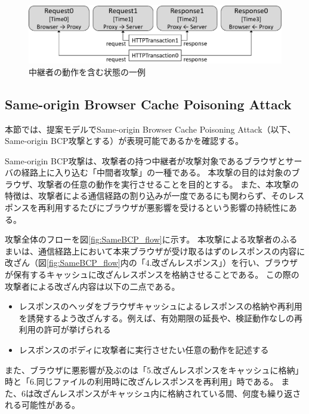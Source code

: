 \documentclass[journal]{IEEEtran}
\begin{document}
\begin{figure}[htb]
\centering
\includegraphics[width=\hsize]{./fig/TestIntermediary.eps}
\caption{中継者の動作を含む状態の一例}
\label{fig:TestIntermediary}
\end{figure}

\subsection{Same-origin Browser Cache Poisoning Attack}
\label{sec:same-origin-bcp}
本節では、提案モデルでSame-origin Browser Cache Poisoning Attack\cite{bcpattack}（以下、Same-origin BCP攻撃とする）が表現可能であるかを確認する。

Same-origin BCP攻撃は、攻撃者の持つ中継者が攻撃対象であるブラウザとサーバの経路上に入り込む「中間者攻撃」の一種である。
本攻撃の目的は対象のブラウザ、攻撃者の任意の動作を実行させることを目的とする。
また、本攻撃の特徴は、攻撃者による通信経路の割り込みが一度であるにも関わらず、そのレスポンスを再利用するたびにブラウザが悪影響を受けるという影響の持続性にある。

攻撃全体のフローを図\ref{fig:SameBCP_flow}に示す。
本攻撃による攻撃者のふるまいは、通信経路上において本来ブラウザが受け取るはずのレスポンスの内容に改ざん（図\ref{fig:SameBCP_flow}内の「4.改ざんレスポンス」）を行い、ブラウザが保有するキャッシュに改ざんレスポンスを格納させることである。
この際の攻撃者による改ざん内容は以下の二点である。
\begin{itemize}
\item レスポンスのヘッダをブラウザキャッシュによるレスポンスの格納や再利用を誘発するよう改ざんする。例えば、有効期限の延長や、検証動作なしの再利用の許可が挙げられる
\item レスポンスのボディに攻撃者に実行させたい任意の動作を記述する
\end{itemize}
また、ブラウザに悪影響が及ぶのは「5.改ざんレスポンスをキャッシュに格納」時と「6.同じファイルの利用時に改ざんレスポンスを再利用」時である。
また、6は改ざんレスポンスがキャッシュ内に格納されている間、何度も繰り返される可能性がある。
\end{document}
